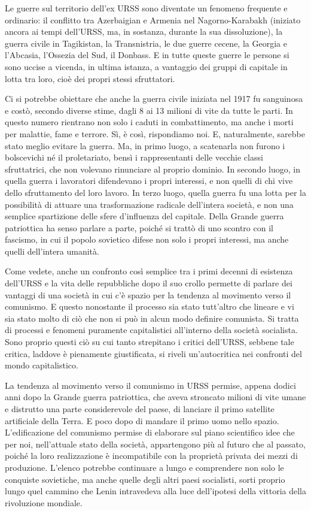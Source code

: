 \documentclass[../main]{subfiles}
\begin{document}
Le guerre sul territorio dell'ex URSS sono diventate un fenomeno frequente e ordinario: il conflitto tra Azerbaigian e Armenia nel Nagorno-Karabakh (iniziato ancora ai tempi dell'URSS, ma, in sostanza, durante la sua dissoluzione), la guerra civile in Tagikistan, la Transnistria, le due guerre cecene, la Georgia e l'Abcasia, l'Ossezia del Sud, il Donbass. E in tutte queste guerre le persone si sono uccise a vicenda, in ultima istanza, a vantaggio dei gruppi di capitale in lotta tra loro, cioè dei propri stessi sfruttatori.

Ci si potrebbe obiettare che anche la guerra civile iniziata nel 1917 fu sanguinosa e costò, secondo diverse stime, dagli 8 ai 13 milioni di vite da tutte le parti. In questo numero rientrano non solo i caduti in combattimento, ma anche i morti per malattie, fame e terrore. Sì, è così, rispondiamo noi. E, naturalmente, sarebbe stato meglio evitare la guerra. Ma, in primo luogo, a scatenarla non furono i bolscevichi né il proletariato, bensì i rappresentanti delle vecchie classi sfruttatrici, che non volevano rinunciare al proprio dominio. In secondo luogo, in quella guerra i lavoratori difendevano i propri interessi, e non quelli di chi vive dello sfruttamento del loro lavoro. In terzo luogo, quella guerra fu una lotta per la possibilità di attuare una trasformazione radicale dell'intera società, e non una semplice spartizione delle sfere d'influenza del capitale. Della Grande guerra patriottica ha senso parlare a parte, poiché si trattò di uno scontro con il fascismo, in cui il popolo sovietico difese non solo i propri interessi, ma anche quelli dell'intera umanità.

Come vedete, anche un confronto così semplice tra i primi decenni di esistenza dell'URSS e la vita delle repubbliche dopo il suo crollo permette di parlare dei vantaggi di una società in cui c'è spazio per la tendenza al movimento verso il comunismo. E questo nonostante il processo sia stato tutt'altro che lineare e vi sia stato molto di ciò che non si può in alcun modo definire comunista. Si tratta di processi e fenomeni puramente capitalistici all'interno della società socialista. Sono proprio questi ciò su cui tanto strepitano i critici dell'URSS, sebbene tale critica, laddove è pienamente giustificata, si riveli un'autocritica nei confronti del mondo capitalistico.

La tendenza al movimento verso il comunismo in URSS permise, appena dodici anni dopo la Grande guerra patriottica, che aveva stroncato milioni di vite umane e distrutto una parte considerevole del paese, di lanciare il primo satellite artificiale della Terra. E poco dopo di mandare il primo uomo nello spazio. L'edificazione del comunismo permise di elaborare sul piano scientifico idee che per noi, nell'attuale stato della società, appartengono più al futuro che al passato, poiché la loro realizzazione è incompatibile con la proprietà privata dei mezzi di produzione. L'elenco potrebbe continuare a lungo e comprendere non solo le conquiste sovietiche, ma anche quelle degli altri paesi socialisti, sorti proprio lungo quel cammino che Lenin intravedeva alla luce dell'ipotesi della vittoria della rivoluzione mondiale.
\end{document}
